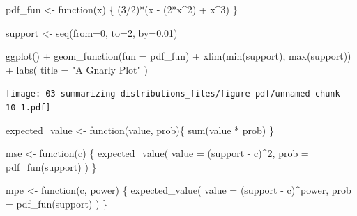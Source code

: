 \documentclass[
  letterpaper,
  DIV=11,
  numbers=noendperiod]{scrreprt}
\newenvironment{Shaded}{\begin{snugshade}}{\end{snugshade}}
\newcommand{\AttributeTok}[1]{\textcolor[rgb]{0.40,0.45,0.13}{#1}}
\newcommand{\ControlFlowTok}[1]{\textcolor[rgb]{0.00,0.23,0.31}{#1}}
\newcommand{\DecValTok}[1]{\textcolor[rgb]{0.68,0.00,0.00}{#1}}
\newcommand{\FloatTok}[1]{\textcolor[rgb]{0.68,0.00,0.00}{#1}}
\newcommand{\FunctionTok}[1]{\textcolor[rgb]{0.28,0.35,0.67}{#1}}
\newcommand{\NormalTok}[1]{\textcolor[rgb]{0.00,0.23,0.31}{#1}}
\newcommand{\OtherTok}[1]{\textcolor[rgb]{0.00,0.23,0.31}{#1}}
\newcommand{\SpecialCharTok}[1]{\textcolor[rgb]{0.37,0.37,0.37}{#1}}
\newcommand{\StringTok}[1]{\textcolor[rgb]{0.13,0.47,0.30}{#1}}
\begin{document}
\begin{Shaded}
\begin{Highlighting}[]
\NormalTok{pdf\_fun }\OtherTok{\textless{}{-}} \ControlFlowTok{function}\NormalTok{(x) \{ }
\NormalTok{  (}\DecValTok{3}\SpecialCharTok{/}\DecValTok{2}\NormalTok{)}\SpecialCharTok{*}\NormalTok{(x }\SpecialCharTok{{-}}\NormalTok{ (}\DecValTok{2}\SpecialCharTok{*}\NormalTok{x}\SpecialCharTok{\^{}}\DecValTok{2}\NormalTok{) }\SpecialCharTok{+}\NormalTok{ x}\SpecialCharTok{\^{}}\DecValTok{3}\NormalTok{)}
\NormalTok{\}}
\end{Highlighting}
\end{Shaded}

\begin{Shaded}
\begin{Highlighting}[]
\NormalTok{support }\OtherTok{\textless{}{-}} \FunctionTok{seq}\NormalTok{(}\AttributeTok{from=}\DecValTok{0}\NormalTok{, }\AttributeTok{to=}\DecValTok{2}\NormalTok{, }\AttributeTok{by=}\FloatTok{0.01}\NormalTok{)}
\end{Highlighting}
\end{Shaded}

\begin{Shaded}
\begin{Highlighting}[]
\FunctionTok{ggplot}\NormalTok{() }\SpecialCharTok{+} 
  \FunctionTok{geom\_function}\NormalTok{(}\AttributeTok{fun =}\NormalTok{ pdf\_fun) }\SpecialCharTok{+} 
  \FunctionTok{xlim}\NormalTok{(}\FunctionTok{min}\NormalTok{(support), }\FunctionTok{max}\NormalTok{(support)) }\SpecialCharTok{+} 
  \FunctionTok{labs}\NormalTok{(}
    \AttributeTok{title =} \StringTok{"A Gnarly Plot"}
\NormalTok{  )}
\end{Highlighting}
\end{Shaded}

\texttt{[image: 03-summarizing-distributions\_files/figure-pdf/unnamed-chunk-10-1.pdf]}

\begin{Shaded}
\begin{Highlighting}[]
\NormalTok{expected\_value }\OtherTok{\textless{}{-}} \ControlFlowTok{function}\NormalTok{(value, prob)\{}
  \FunctionTok{sum}\NormalTok{(value }\SpecialCharTok{*}\NormalTok{ prob)}
\NormalTok{\}}

\NormalTok{mse }\OtherTok{\textless{}{-}} \ControlFlowTok{function}\NormalTok{(c) \{ }
  \FunctionTok{expected\_value}\NormalTok{(}
    \AttributeTok{value =}\NormalTok{ (support }\SpecialCharTok{{-}}\NormalTok{ c)}\SpecialCharTok{\^{}}\DecValTok{2}\NormalTok{, }
    \AttributeTok{prob  =} \FunctionTok{pdf\_fun}\NormalTok{(support)}
\NormalTok{  )  }
\NormalTok{\}}

\NormalTok{mpe }\OtherTok{\textless{}{-}} \ControlFlowTok{function}\NormalTok{(c, power) \{ }
  \FunctionTok{expected\_value}\NormalTok{(}
    \AttributeTok{value =}\NormalTok{ (support }\SpecialCharTok{{-}}\NormalTok{ c)}\SpecialCharTok{\^{}}\NormalTok{power, }
    \AttributeTok{prob  =} \FunctionTok{pdf\_fun}\NormalTok{(support)}
\NormalTok{  )}
\NormalTok{\}}
\end{Highlighting}
\end{Shaded}
\end{document}
